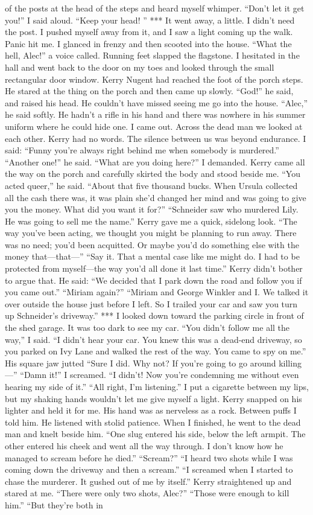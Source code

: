 \documentclass{novel}
\begin{document}
of the posts at the head of the steps and heard myself whimper. “Don’t let it get you!” I said aloud. “Keep your head! ” *** It went away, a little. I didn’t need the post. I pushed myself away from it, and I saw a light coming up the walk. Panic hit me. I glanced in frenzy and then scooted into the house. “What the hell, Alec!” a voice called. Running feet slapped the flagstone. I hesitated in the hall and went back to the door on my toes and looked through the small rectangular door window. Kerry Nugent had reached the foot of the porch steps. He stared at the thing on the porch and then came up slowly. “God!” he said, and raised his head. He couldn’t have missed seeing me go into the house. “Alec,” he said softly. He hadn’t a rifle in his hand and there was nowhere in his summer uniform where he could hide one. I came out. Across the dead man we looked at each other. Kerry had no words. The silence between us was beyond endurance. I said: “Funny you’re always right behind me when somebody is murdered.” “Another one!” he said. “What are you doing here?” I demanded. Kerry came all the way on the porch and carefully skirted the body and stood beside me. “You acted queer,” he said. “About that five thousand bucks. When Ursula collected all the cash there was, it was plain she’d changed her mind and was going to give you the money. What did you want it for?” “Schneider saw who murdered Lily. He was going to sell me the name.” Kerry gave me a quick, sidelong look. “The way you’ve been acting, we thought you might be planning to run away. There was no need; you’d been acquitted. Or maybe you’d do something else with the money that—that—” “Say it. That a mental case like me might do. I had to be protected from myself—the way you’d all done it last time.” Kerry didn’t bother to argue that. He said: “We decided that I park down the road and follow you if you came out.” “Miriam again?” “Miriam and George Winkler and I. We talked it over outside the house just before I left. So I trailed your car and saw you turn up Schneider’s driveway.” *** I looked down toward the parking circle in front of the shed garage. It was too dark to see my car. “You didn’t follow me all the way,” I said. “I didn’t hear your car. You knew this was a dead-end driveway, so you parked on Ivy Lane and walked the rest of the way. You came to spy on me.” His square jaw jutted “Sure I did. Why not? If you’re going to go around killing—” “Damn it!” I screamed. “I didn’t! Now you’re condemning me without even hearing my side of it.” “All right, I’m listening.” I put a cigarette between my lips, but my shaking hands wouldn’t let me give myself a light. Kerry snapped on his lighter and held it for me. His hand was as nerveless as a rock. Between puffs I told him. He listened with stolid patience. When I finished, he went to the dead man and knelt beside him. “One slug entered his side, below the left armpit. The other entered his cheek and went all the way through. I don’t know how he managed to scream before he died.” “Scream?” “I heard two shots while I was coming down the driveway and then a scream.” “I screamed when I started to chase the murderer. It gushed out of me by itself.” Kerry straightened up and stared at me. “There were only two shots, Alec?” “Those were enough to kill him.” “But they’re both in 
\end{document}
